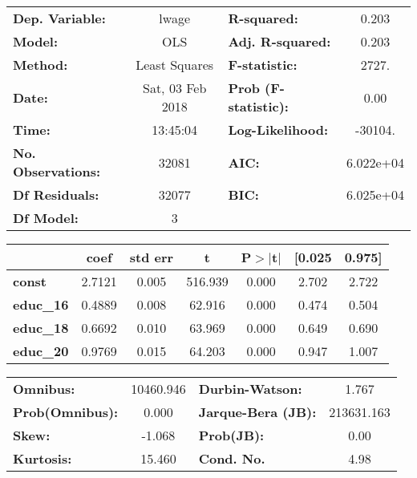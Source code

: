 \begin{center}
\begin{tabular}{lclc}
\toprule
\textbf{Dep. Variable:}    &      lwage       & \textbf{  R-squared:         } &     0.203   \\
\textbf{Model:}            &       OLS        & \textbf{  Adj. R-squared:    } &     0.203   \\
\textbf{Method:}           &  Least Squares   & \textbf{  F-statistic:       } &     2727.   \\
\textbf{Date:}             & Sat, 03 Feb 2018 & \textbf{  Prob (F-statistic):} &     0.00    \\
\textbf{Time:}             &     13:45:04     & \textbf{  Log-Likelihood:    } &   -30104.   \\
\textbf{No. Observations:} &       32081      & \textbf{  AIC:               } & 6.022e+04   \\
\textbf{Df Residuals:}     &       32077      & \textbf{  BIC:               } & 6.025e+04   \\
\textbf{Df Model:}         &           3      & \textbf{                     } &             \\
\bottomrule
\end{tabular}
\begin{tabular}{lcccccc}
                  & \textbf{coef} & \textbf{std err} & \textbf{t} & \textbf{P$>$$|$t$|$} & \textbf{[0.025} & \textbf{0.975]}  \\
\midrule
\textbf{const}    &       2.7121  &        0.005     &   516.939  &         0.000        &        2.702    &        2.722     \\
\textbf{educ\_16} &       0.4889  &        0.008     &    62.916  &         0.000        &        0.474    &        0.504     \\
\textbf{educ\_18} &       0.6692  &        0.010     &    63.969  &         0.000        &        0.649    &        0.690     \\
\textbf{educ\_20} &       0.9769  &        0.015     &    64.203  &         0.000        &        0.947    &        1.007     \\
\bottomrule
\end{tabular}
\begin{tabular}{lclc}
\textbf{Omnibus:}       & 10460.946 & \textbf{  Durbin-Watson:     } &     1.767   \\
\textbf{Prob(Omnibus):} &    0.000  & \textbf{  Jarque-Bera (JB):  } & 213631.163  \\
\textbf{Skew:}          &   -1.068  & \textbf{  Prob(JB):          } &      0.00   \\
\textbf{Kurtosis:}      &   15.460  & \textbf{  Cond. No.          } &      4.98   \\
\bottomrule
\end{tabular}
\end{center}
